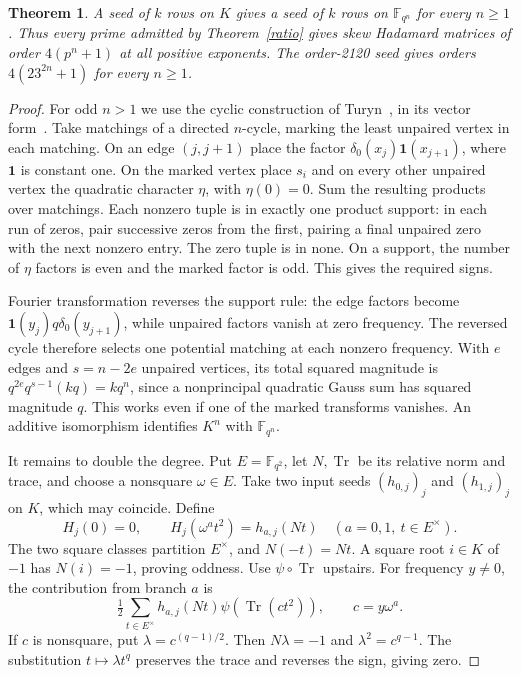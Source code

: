 \documentclass[11pt]{article}
\newtheorem{theorem}{Theorem}
\newcommand{\F}{\mathbb F}
\newcommand{\one}{\mathbf1}
\begin{document}
\begin{theorem}\label{allpowers}
A seed of $k$ rows on $K$ gives a seed of $k$ rows on $\F_{q^n}$ for every $n\ge1$. Thus every prime admitted by Theorem~\ref{ratio} gives skew Hadamard matrices of order $4(p^n+1)$ at all positive exponents. The order-2120 seed gives orders $4(23^{2n}+1)$ for every $n\ge1$.
\end{theorem}
\begin{proof}
For odd $n>1$ we use the cyclic construction of Turyn~\cite{Turyn}, in its vector form~\cite{Kline}. Take matchings of a directed $n$-cycle, marking the least unpaired vertex in each matching. On an edge $(j,j+1)$ place the factor $\delta_0(x_j)\one(x_{j+1})$, where $\one$ is constant one. On the marked vertex place $s_i$ and on every other unpaired vertex the quadratic character $\eta$, with $\eta(0)=0$. Sum the resulting products over matchings. Each nonzero tuple is in exactly one product support: in each run of zeros, pair successive zeros from the first, pairing a final unpaired zero with the next nonzero entry. The zero tuple is in none. On a support, the number of $\eta$ factors is even and the marked factor is odd. This gives the required signs.

Fourier transformation reverses the support rule: the edge factors become $\one(y_j)q\delta_0(y_{j+1})$, while unpaired factors vanish at zero frequency. The reversed cycle therefore selects one potential matching at each nonzero frequency. With $e$ edges and $s=n-2e$ unpaired vertices, its total squared magnitude is $q^{2e}q^{s-1}(kq)=kq^n$, since a nonprincipal quadratic Gauss sum has squared magnitude $q$. This works even if one of the marked transforms vanishes. An additive isomorphism identifies $K^n$ with $\F_{q^n}$.

It remains to double the degree. Put $E=\F_{q^2}$, let $N,\operatorname{Tr}$ be its relative norm and trace, and choose a nonsquare $\omega\in E$. Take two input seeds $(h_{0,j})_j$ and $(h_{1,j})_j$ on $K$, which may coincide. Define
\[
 H_j(0)=0,\qquad H_j(\omega^a t^2)=h_{a,j}(Nt)
       \quad(a=0,1,\ t\in E^\times).
\]
The two square classes partition $E^\times$, and $N(-t)=Nt$. A square root $i\in K$ of $-1$ has $N(i)=-1$, proving oddness. Use $\psi\circ\operatorname{Tr}$ upstairs. For frequency $y\ne0$, the contribution from branch $a$ is
\[
 \tfrac12\sum_{t\in E^\times}h_{a,j}(Nt)\psi(\operatorname{Tr}(ct^2)),
 \qquad c=y\omega^a.
\]
If $c$ is nonsquare, put $\lambda=c^{(q-1)/2}$. Then $N\lambda=-1$ and $\lambda^2=c^{q-1}$. The substitution $t\mapsto\lambda t^q$ preserves the trace and reverses the sign, giving zero.


\end{proof}
\end{document}
